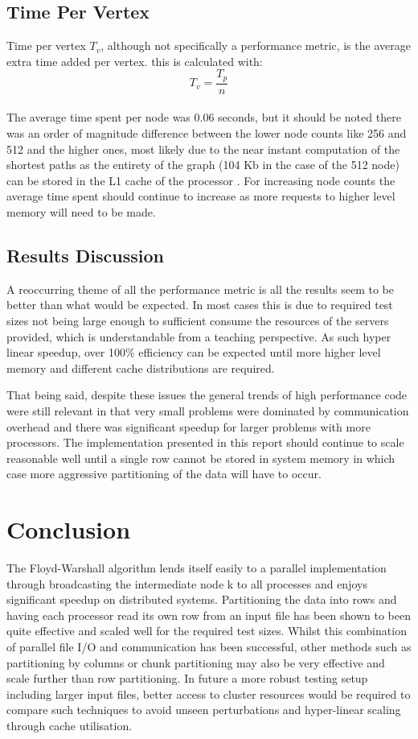 \documentclass[12pt]{article}
\begin{document}

\subsection{Time Per Vertex}
Time per vertex \(T_v\), although not specifically a performance metric, is the average extra time added per vertex. this is calculated with:
\[T_v = \frac{T_p}{n}\] \\
The average time spent per node was 0.06 seconds, but it should be noted there was an order of magnitude difference between the lower node counts like 256 and 512 and the higher ones, most likely due to the near instant computation of the shortest paths as the entirety of the graph (104 Kb in the case of the 512 node) can be stored in the L1 cache of the processor \cite{forum}. For increasing node counts the average time spent should continue to increase as more requests to higher level memory will need to be made. 


\subsection{Results Discussion}

A reoccurring theme of all the performance metric is all the results seem to be better than what would be expected. In most cases this is due to required test sizes not being large enough to sufficient consume the resources of the servers provided, which is understandable from a teaching perspective. As such hyper linear speedup, over 100\% efficiency can be expected until more higher level memory and different cache distributions are required. 

That being said, despite these issues the general trends of high performance code were still relevant in that very small problems were dominated by communication overhead and there was significant speedup for larger problems with more processors. The implementation presented in this report should continue to scale reasonable well until a single row cannot be stored in system memory in which case more aggressive partitioning of the data will have to occur. 


\section{Conclusion}

The Floyd-Warshall algorithm lends itself easily to a parallel implementation through broadcasting the intermediate node k to all processes and enjoys significant speedup on distributed systems. Partitioning the data into rows and having each processor read its own row from an input file has been shown to been quite effective and scaled well for the required test sizes. Whilst this combination of parallel file I/O and communication has been successful, other methods such as partitioning by columns or chunk partitioning may also be very effective and scale further than row partitioning. In future a more robust testing setup including larger input files, better access to cluster resources would be required to compare such techniques to avoid unseen perturbations and hyper-linear scaling through cache utilisation. 

 
 

 
\end{document}
